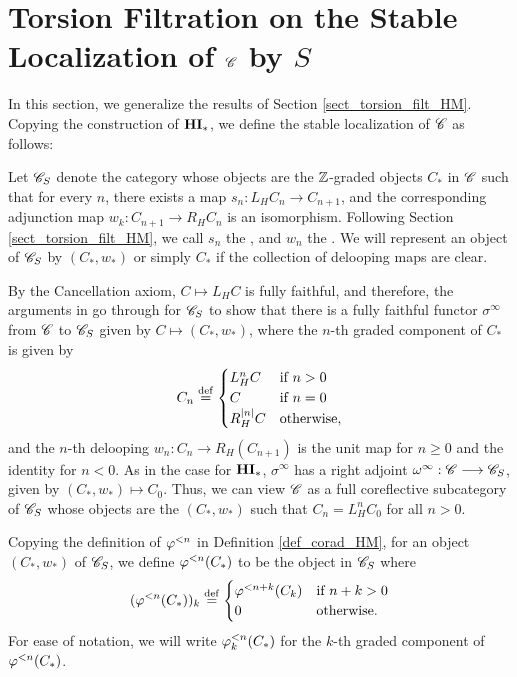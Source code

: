 \section{Torsion Filtration on the Stable Localization of 
$\mathscr{C}$ by $S$}

In this section, we generalize the results of Section 
\ref{sect_torsion_filt_HM}. Copying the construction of $\mathbf{HI}_*$, we
define the stable localization of $\mathscr{C}$ as follows:

\begin{defn}\label{def_C_loc_S}
Let $\mathscr{C}_{S}$ denote the category whose objects are 
the $\mathbb{Z}$-graded objects $C_*$ in $\mathscr{C}$ such that for every $n$,
there exists a map $s_n: L_HC_n \to C_{n + 1}$, and the 
corresponding adjunction map $w_k: C_{n + 1} \to R_HC_n$ is an
isomorphism. Following Section \ref{sect_torsion_filt_HM}, we call
$s_n$ the , and $w_n$ the . We will represent an object of $\mathscr{C}_{S}$ by
$(C_*, w_*)$ or simply $C_*$ if the collection of delooping maps 
are clear.
\end{defn}

By the Cancellation axiom, $C \mapsto L_HC$ is fully faithful,
and therefore, the arguments in \cite[1.8]{DegModHom} go through
for $\mathscr{C}_{S}$ to show that there is a fully faithful 
functor $\sigma^\infty$ from $\mathscr{C}$ to $\mathscr{C}_{S}$ given by
$C \mapsto (C_*, w_*)$, where the $n$-th graded component of $C_*$
is given by
\[
C_n \stackrel{\mathrm{def}}{=} \begin{cases}
L_H^nC &\textrm{if }n > 0\\
C      &\textrm{if }n = 0\\
R_H^{|n|} C &\textrm{otherwise},
\end{cases}
\]
and the $n$-th delooping $w_n: C_n \to R_H(C_{n + 1})$ is the unit
map for $n \geq 0$ and the identity for $n < 0$. As in the case for
$\mathbf{HI}_*$, $\sigma^\infty$ has a right adjoint $\omega^\infty: \mathscr{C}
\longrightarrow \mathscr{C}_{S}$, given by $(C_*, w_*) \mapsto C_0$. Thus, we
can view $\mathscr{C}$ as a full coreflective subcategory of 
$\mathscr{C}_{S}$ whose objects are the $(C_*, w_*)$ such that 
$C_n = L_H^nC_0$ for all $n > 0$. 

\begin{defn}\label{def_corad_loc_gen}
Copying the definition of $\varphi^{< n}$ in Definition 
\ref{def_corad_HM}, for an object $(C_*, w_*)$ of $\mathscr{C}_{S}$,
we define $\varphi^{< n}(C_*)$ to be the object in 
$\mathscr{C}_{S}$ where
\[
(\varphi^{< n}(C_*))_k \stackrel{\mathrm{def}}{=}
\begin{cases}
\varphi^{< n + k}(C_k) &\textrm{if }n + k > 0\\
0  &\textrm{otherwise}.
\end{cases}
\]
For ease of notation, we will write $\varphi^{< n}_k(C_*)$ for the 
$k$-th graded component of $\varphi^{< n}(C_*)$.
\end{defn}

